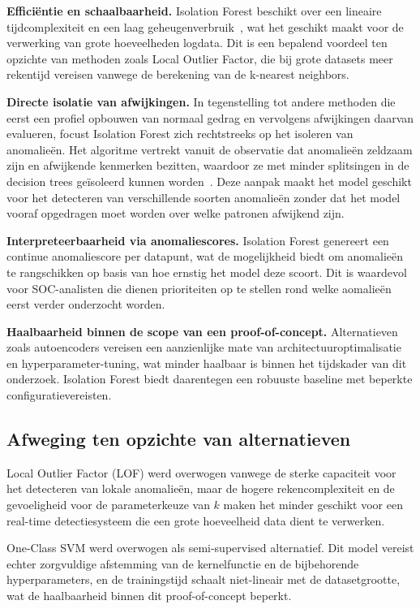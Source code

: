 \textbf{Efficiëntie en schaalbaarheid.} Isolation Forest beschikt over een lineaire tijdcomplexiteit en een laag geheugenverbruik~\autocite{Lesouple2021}, wat het geschikt maakt voor de verwerking van grote hoeveelheden logdata. Dit is een bepalend voordeel ten opzichte van methoden zoals Local Outlier Factor, die bij grote datasets meer rekentijd vereisen vanwege de berekening van de k-nearest neighbors.

\textbf{Directe isolatie van afwijkingen.} In tegenstelling tot andere methoden die eerst een profiel opbouwen van normaal gedrag en vervolgens afwijkingen daarvan evalueren, focust Isolation Forest zich rechtstreeks op het isoleren van anomalieën. Het algoritme vertrekt vanuit de observatie dat anomalieën zeldzaam zijn en afwijkende kenmerken bezitten, waardoor ze met minder splitsingen in de decision trees geïsoleerd kunnen worden~\autocite{Liu2008}. Deze aanpak maakt het model geschikt voor het detecteren van verschillende soorten anomalieën zonder dat het model vooraf opgedragen moet worden over welke patronen afwijkend zijn.

\textbf{Interpreteerbaarheid via anomaliescores.} Isolation Forest genereert een continue anomaliescore per datapunt, wat de mogelijkheid biedt om anomalieën te rangschikken op basis van hoe ernstig het model deze scoort. Dit is waardevol voor SOC-analisten die dienen prioriteiten op te stellen rond welke aomalieën eerst verder onderzocht worden. 

\textbf{Haalbaarheid binnen de scope van een proof-of-concept.} Alternatieven zoals autoencoders vereisen een aanzienlijke mate van architectuuroptimalisatie en hyperparameter-tuning, wat minder haalbaar is binnen het tijdskader van dit onderzoek. Isolation Forest biedt daarentegen een robuuste baseline met beperkte configuratievereisten.

\subsection{Afweging ten opzichte van alternatieven} 
\label{subsec:afweging-alternatieven}

Local Outlier Factor (LOF) werd overwogen vanwege de sterke capaciteit voor het detecteren van lokale anomalieën, maar de hogere rekencomplexiteit en de gevoeligheid voor de parameterkeuze van $k$ maken het minder geschikt voor een real-time detectiesysteem die een grote hoeveelheid data dient te verwerken.

One-Class SVM werd overwogen als semi-supervised alternatief. Dit model vereist echter zorgvuldige afstemming van de kernelfunctie en de bijbehorende hyperparameters, en de trainingstijd schaalt niet-lineair met de datasetgrootte, wat de haalbaarheid binnen dit proof-of-concept beperkt.

